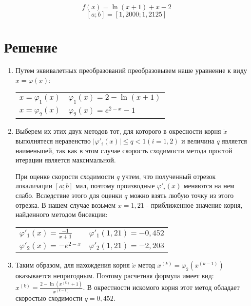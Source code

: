 \documentclass[a4paper,12pt]{article} %
\begin{document}
$$f(x) = \ln (x + 1) + x - 2$$
$$[a; b] = [1,2000; 1,2125]$$

\section{Решение}

\begin{enumerate}

\item Путем эквивалетных преобразований преобразовывем наше уравнение к виду $x = \varphi(x)$:
\vspace{0.5cm}
\begin{center}
\begin{tabular}{l l}
$x = \varphi_1 (x)$ & $\varphi_1 (x) = 2 - \ln(x + 1)$ \\
$x = \varphi_2 (x)$ & $\varphi_2 (x) = e^{2-x} - 1$ \\
\end{tabular}
\end{center}

\vspace{0.5cm}

\item Выберем их этих двух методов тот, для которого в окресности корня $\dot x$ выполнятеся неравенство $|\varphi'_i (x)| \leq q < 1 (i = 1, 2)$ и величина $q$ является наименьшей, так как в этом случае скорость сходимости метода простой итерации является максимальной.

При оценке скорости сходимости $q$ учтем, что полученный отрезок локализации $[a; b]$ мал, поэтому производные $\varphi'_i (x)$ меняются на нем слабо. Вследствие этого для оценки $q$ можно взять любую точку из этого отрезка. В нашем случае возьмем $x = 1,21$ - приближенное значение корня, найденного методом бисекции:

\begin{center}
\begin{tabular}{l l}
$\varphi'_1 (x) = \frac{-1}{x + 1}$ & $\varphi'_1 (1,21) = -0,452$ \\
$\varphi'_2 (x) = -e^{2 - x}$ & $\varphi'_2 (1,21) = -2,203$ \\
\end{tabular}
\end{center}

\newpage

\item Таким образом, для нахождения корня $\dot x$ метод $x^{(k)} = \varphi_2 (x^{(k - 1)})$ оказывается непригодным. Поэтому расчетная формула имеет вид: $x^{(k)} = \frac{2 - \ln(x^{(k)} + 1)}{x^{(k - 1)}}$. В окрестности искомого корня этот метод обладает скоростью сходимости $q = 0,452$.


\end{enumerate}
\end{document}
